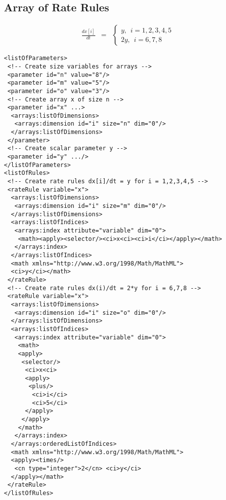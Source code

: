 

\subsection{Array of Rate Rules}

\begin{eqnarray*}
\frac{dx[i]}{dt} & = & \left\{ \begin{array}{l}
  y,~~i = 1,2,3,4,5 \\
 2y,~~i = 6, 7, 8 
\end{array}
\right.
\end{eqnarray*}
\begin{verbatim}
<listOfParameters>
 <!-- Create size variables for arrays -->
 <parameter id="n" value="8"/>
 <parameter id="m" value="5"/>
 <parameter id="o" value="3"/>
 <!-- Create array x of size n -->
 <parameter id="x" ...> 
  <arrays:listOfDimensions>
   <arrays:dimension id="i" size="n" dim="0"/>
  </arrays:listOfDimensions>
 </parameter>
 <!-- Create scalar parameter y -->
 <parameter id="y" .../>
</listOfParameters>
<listOfRules>
 <!-- Create rate rules dx[i]/dt = y for i = 1,2,3,4,5 -->
 <rateRule variable="x">
  <arrays:listOfDimensions>
   <arrays:dimension id="i" size="m" dim="0"/>
  </arrays:listOfDimensions>
  <arrays:listOfIndices>
   <arrays:index attribute="variable" dim="0">
    <math><apply><selector/><ci>x<ci><ci>i</ci></apply></math>
   </arrays:index>
  </arrays:listOfIndices>
  <math xmlns="http://www.w3.org/1998/Math/MathML">
  <ci>y</ci></math>
 </rateRule>
 <!-- Create rate rules dx(i)/dt = 2*y for i = 6,7,8 -->
 <rateRule variable="x">
  <arrays:listOfDimensions>
   <arrays:dimension id="i" size="o" dim="0"/>
  </arrays:listOfDimensions>
  <arrays:listOfIndices>
   <arrays:index attribute="variable" dim="0">
    <math>
    <apply>
     <selector/>
      <ci>x<ci>
      <apply>
       <plus/>
        <ci>i</ci>
        <ci>5</ci>
      </apply>
     </apply>
    </math>
   </arrays:index>
  </arrays:orderedListOfIndices>
  <math xmlns="http://www.w3.org/1998/Math/MathML">
  <apply><times/>
   <cn type="integer">2</cn> <ci>y</ci>
  </apply></math> 
 </rateRule>
</listOfRules>
\end{verbatim}

